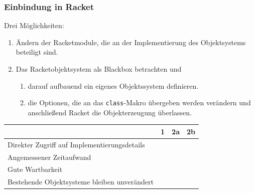 \documentclass{beamer}
\newcommand{\cmark}{\ding{51}}%
\newcommand{\xmark}{\ding{55}}%
\begin{document}
\begin{frame}
 \frametitle{Einbindung in Racket}
 Drei Möglichkeiten:
 \begin{enumerate}
 \item Ändern der Racketmodule, die an der Implementierung des Objektsystems beteiligt sind.
 \item Das Racketobjektsystem als Blackbox betrachten und 
 \begin{enumerate}[a]
  \item darauf aufbauend ein eigenes Objektssystem definieren. 
  \item die Optionen, die an das \texttt{class}-Makro übergeben werden verändern und anschließend Racket die Objekterzeugung überlassen.
 \end{enumerate}
\end{enumerate}
\pause
  \begin{table}[h]
\centering\small
\begin{tabular}{|l|c|c|c|}
 \hline
 & \textbf{1} & \textbf{2a} & \textbf{2b}\\\hline
 Direkter Zugriff auf Implementierungsdetails   & \cmark & \cmark & \xmark \\\hline
 Angemessener Zeitaufwand                     & \xmark & \cmark & \cmark \\\hline
 Gute Wartbarkeit                             & \xmark & \cmark & \cmark \\\hline 
 Bestehende Objektsysteme bleiben unverändert & \xmark & \xmark & \cmark \\\hline
\end{tabular}
\label{einbindung}
\end{table}
\end{frame}
\end{document}
